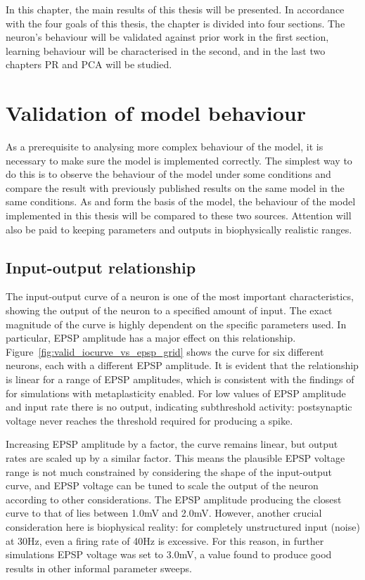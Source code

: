 \documentclass[a4paper,12pt]{report}
\theoremstyle{definition}
\begin{document}
In this chapter, the main results of this thesis will be presented. In accordance with the four goals of this thesis, the chapter is divided into four sections. The neuron's behaviour will be validated against prior work in the first section, learning behaviour will be characterised in the second, and in the last two chapters PR and PCA will be studied.

\section{Validation of model behaviour}
\label{sec:validation}

As a prerequisite to analysing more complex behaviour of the model, it is necessary to make sure the model is implemented correctly. The simplest way to do this is to observe the behaviour of the model under some conditions and compare the result with previously published results on the same model in the same conditions. As \cite{shouval2002unified} and \cite{yeung2004synaptic} form the basis of the model, the behaviour of the model implemented in this thesis will be compared to these two sources. Attention will also be paid to keeping parameters and outputs in biophysically realistic ranges.

\subsection{Input-output relationship}
\label{subsec:iocurve}

The input-output curve of a neuron is one of the most important characteristics, showing the output of the neuron to a specified amount of input. The exact magnitude of the curve is highly dependent on the specific parameters used. In particular, EPSP amplitude has a major effect on this relationship. 
Figure~\ref{fig:valid_iocurve_vs_epsp_grid} shows the curve for six different neurons, each with a different EPSP amplitude. It is evident that the relationship is linear for a range of EPSP amplitudes, which is consistent with the findings of \cite{yeung2004synaptic} for simulations with metaplasticity enabled. For low values of EPSP amplitude and input rate there is no output, indicating subthreshold activity: postsynaptic voltage never reaches the threshold required for producing a spike.

Increasing EPSP amplitude by a factor, the curve remains linear, but output rates are scaled up by a similar factor. This means the plausible EPSP voltage range is not much constrained by considering the shape of the input-output curve, and EPSP voltage can be tuned to scale the output of the neuron according to other considerations. The EPSP amplitude producing the closest curve to that of \cite{yeung2004synaptic} lies between 1.0mV and 2.0mV. However, another crucial consideration here is biophysical reality: for completely unstructured input (noise) at 30Hz, even a firing rate of 40Hz is excessive. For this reason, in further simulations EPSP voltage was set to 3.0mV, a value found to produce good results in other informal parameter sweeps.
\end{document}
